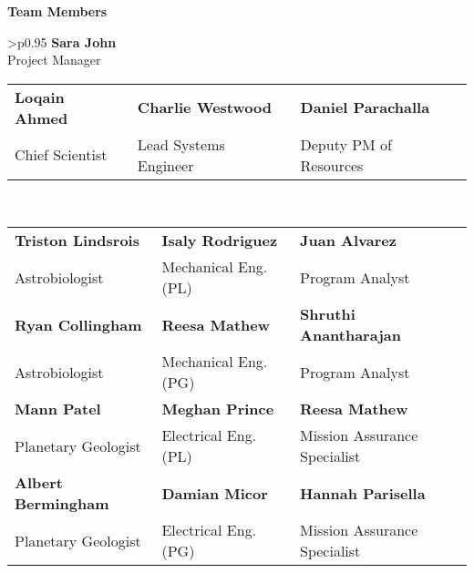 \vspace{2em}

\noindent
\begin{center}
\begin{minipage}{\textwidth}
\centering
\vspace{10em}
\textbf{\Large Team Members}

\vspace{2em}

\begin{tabular}{>{\centering\arraybackslash}p{}}
\textbf{Sara John} \\ 
\small Project Manager \\
\begin{tabular}{>{\centering\arraybackslash}p{} >{\centering\arraybackslash}p{} >{\centering\arraybackslash}p{}}
\textbf{Loqain Ahmed} & \textbf{Charlie Westwood} & \textbf{Daniel Parachalla} \\
\small Chief Scientist & \small Lead Systems Engineer & \small Deputy PM of Resources \\
\end{tabular} \\[1em]
\begin{tabular}{>{\centering\arraybackslash}p{} >{\centering\arraybackslash}p{} >{\centering\arraybackslash}p{}}

\textbf{Triston Lindsrois} & \textbf{Isaly Rodriguez} & \textbf{Juan Alvarez} \\
\small Astrobiologist & \small Mechanical Eng. (PL) & \small Program Analyst \\

\textbf{Ryan Collingham} & \textbf{Reesa Mathew} & \textbf{Shruthi Anantharajan} \\
\small Astrobiologist & \small Mechanical Eng. (PG) & \small Program Analyst \\

\textbf{Mann Patel} & \textbf{Meghan Prince} & \textbf{Reesa Mathew} \\
\small Planetary Geologist & \small Electrical Eng. (PL) & \small Mission Assurance Specialist \\

\textbf{Albert Bermingham} & \textbf{Damian Micor} & \textbf{Hannah Parisella} \\
\small Planetary Geologist & \small Electrical Eng. (PG) & \small Mission Assurance Specialist \\


\end{tabular}
\end{tabular}
\end{minipage}
\end{center}
